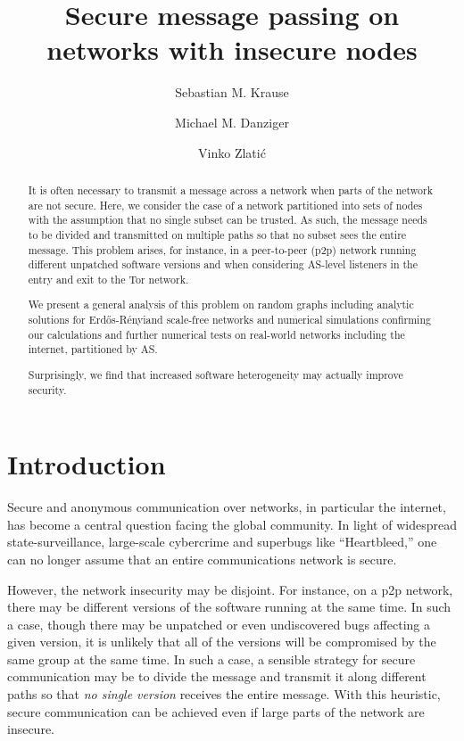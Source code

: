 \documentclass[aps, pre, twocolumn, a4paper, floatfix]{revtex4}
\newcommand{\er}{Erd\H{o}s-R\'{e}nyi}
\begin{document}
\title{Secure message passing on networks with insecure nodes}

\author{Sebastian M. Krause}
\author{Michael M. Danziger}
\author{Vinko Zlati\'{c}}
\begin{abstract}
It is often necessary to transmit a message across a network when parts of the network are not secure.
Here, we consider the case of a network partitioned into sets of nodes with the assumption that no single subset can be trusted.
As such, the message needs to be divided and transmitted on multiple paths so that no subset sees the entire message.
This problem arises, for instance, in a peer-to-peer (p2p) network running different unpatched software versions 
and when considering AS-level listeners in the entry and exit to the Tor network.

We present a general analysis of this problem on random graphs including analytic solutions for \er and scale-free networks and numerical simulations confirming our calculations and further numerical tests on real-world networks including the internet, partitioned by AS.

Surprisingly, we find that increased software heterogeneity may actually improve security.
\end{abstract}
\maketitle


\section{Introduction}

Secure and anonymous communication over networks, in particular the internet, has become a central question facing the global community.
In light of widespread state-surveillance, large-scale cybercrime and superbugs like ``Heartbleed,'' one can no longer assume that an entire communications network is secure.

However, the network insecurity may be disjoint.  
For instance, on a p2p network, there may be different versions of the software running at the same time.  
In such a case, though there may be unpatched or even undiscovered bugs affecting a given version, it is unlikely that all of the versions will be compromised by the same group at the same time.
In such a case, a sensible strategy for secure communication may be to divide the message and transmit it along different paths so that \textit{no single version} receives the entire message.
With this heuristic, secure communication can be achieved even if large parts of the network are insecure.
\end{document}
